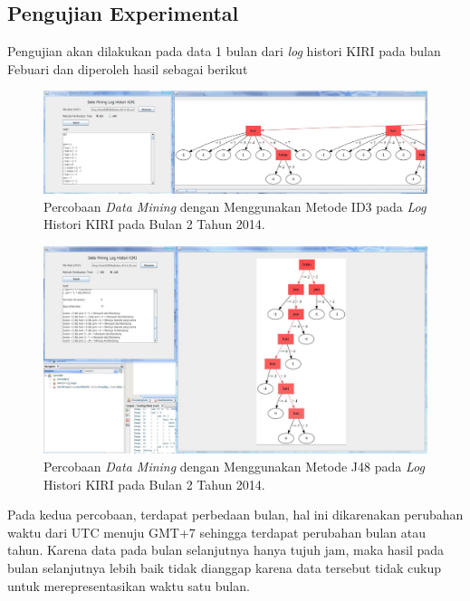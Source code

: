 \subsection{Pengujian Experimental}

Pengujian akan dilakukan pada data 1 bulan dari \textsl{log} histori KIRI pada bulan Febuari dan diperoleh hasil sebagai berikut

\begin{figure}[H]
\centering
\includegraphics[scale=0.5]{Gambar/percobaan1.jpg}
\caption[Percobaan \textsl{Data Mining} dengan Menggunakan Metode ID3 pada \textsl{Log} Histori KIRI pada Bulan 2 Tahun 2014]{Percobaan \textsl{Data Mining} dengan Menggunakan Metode ID3 pada \textsl{Log} Histori KIRI pada Bulan 2 Tahun 2014.} 
\label{fig:percobaan1}
\end{figure}

\begin{figure}[H]
\centering
\includegraphics[scale=0.3]{Gambar/percobaan2.jpg}
\caption[Percobaan \textsl{Data Mining} dengan Menggunakan Metode J48 pada \textsl{Log} Histori KIRI pada Bulan 2 Tahun 2014]{Percobaan \textsl{Data Mining} dengan Menggunakan Metode J48 pada \textsl{Log} Histori KIRI pada Bulan 2 Tahun 2014.} 
\label{fig:percobaan2}
\end{figure}

Pada kedua percobaan, terdapat perbedaan bulan, hal ini dikarenakan perubahan waktu dari UTC menuju GMT+7 sehingga terdapat perubahan bulan atau tahun. Karena data pada bulan selanjutnya hanya tujuh jam, maka hasil pada bulan selanjutnya lebih baik tidak dianggap karena data tersebut tidak cukup untuk merepresentasikan waktu satu bulan.

